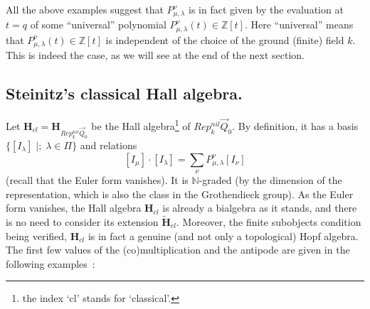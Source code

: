 \documentclass[a4paper,10pt]{amsart}
\def\Z{\mathbb{Z}}
\def\H{\mathbf{H}}
\def\N{\mathbb{N}}
\numberwithin{equation}{section}
\begin{document}
\vspace{.15in}

All the above examples suggest that $P^{\nu}_{\mu,\lambda}$ is in fact given by the evaluation at $t=q$ of some ``universal'' polynomial $P_{\mu,\lambda}^{\nu}(t) \in \Z[t]$. Here ``universal'' means that $P_{\mu,\lambda}^{\nu}(t) \in \Z[t]$ is independent of the choice of the ground (finite) field $k$. This is indeed the case, as we will see at the end of the next section.

\vspace{.2in}

\subsection{Steinitz's classical Hall algebra.}

\vspace{.15in}

Let $\H_{cl}=\H_{Rep^{nil}_k\vec{Q}_0}$ be the Hall algebra\footnote{the index `cl' stands for `classical'.} of $Rep^{nil}_k\vec{Q}_0$. By definition, it has a basis $\{[I_{\lambda}]\;|;\; \lambda \in \Pi\}$ and relations
$$[I_{\mu}] \cdot [I_{\lambda}]=\sum_{\nu} P^{\nu}_{\mu,\lambda} [I_{\nu}]$$
(recall that the Euler form vanishes). It is $\N$-graded (by the dimension of the representation, which is also the class in the Grothendieck group). As the Euler form vanishes, the Hall algebra $\H_{cl}$ is already a bialgebra as it stands, and there is no need to consider its extension $\widetilde{\H}_{cl}$. Moreover, the finite subobjects condition being verified, $\H_{cl}$ is in fact a genuine (and not only a topological) Hopf algebra. The first few values of the (co)multiplication and the antipode are given in the following examples~:

\vspace{.15in}

\addtocounter{theo}{1}
\end{document}
